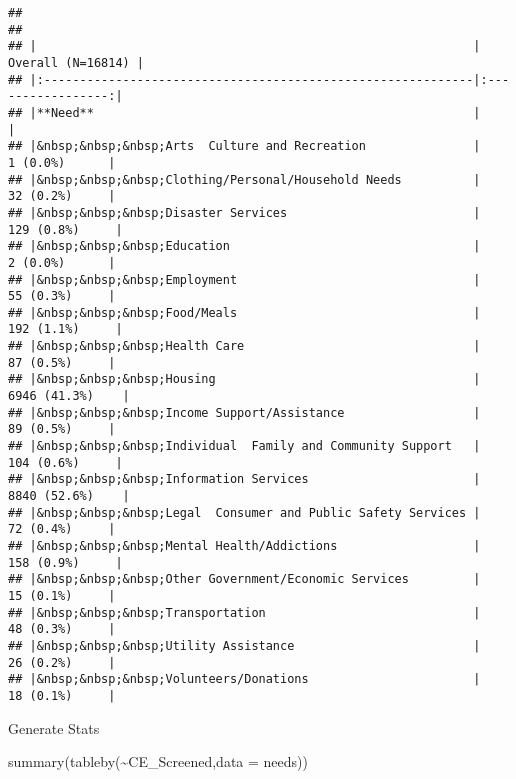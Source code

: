 \documentclass[
]{article}
\newenvironment{Shaded}{\begin{snugshade}}{\end{snugshade}}
\newcommand{\AttributeTok}[1]{\textcolor[rgb]{0.77,0.63,0.00}{#1}}
\newcommand{\FunctionTok}[1]{\textcolor[rgb]{0.00,0.00,0.00}{#1}}
\newcommand{\NormalTok}[1]{#1}
\newcommand{\SpecialCharTok}[1]{\textcolor[rgb]{0.00,0.00,0.00}{#1}}
\begin{document}
\begin{verbatim}
## 
## 
## |                                                             | Overall (N=16814) |
## |:------------------------------------------------------------|:-----------------:|
## |**Need**                                                     |                   |
## |&nbsp;&nbsp;&nbsp;Arts  Culture and Recreation               |     1 (0.0%)      |
## |&nbsp;&nbsp;&nbsp;Clothing/Personal/Household Needs          |     32 (0.2%)     |
## |&nbsp;&nbsp;&nbsp;Disaster Services                          |    129 (0.8%)     |
## |&nbsp;&nbsp;&nbsp;Education                                  |     2 (0.0%)      |
## |&nbsp;&nbsp;&nbsp;Employment                                 |     55 (0.3%)     |
## |&nbsp;&nbsp;&nbsp;Food/Meals                                 |    192 (1.1%)     |
## |&nbsp;&nbsp;&nbsp;Health Care                                |     87 (0.5%)     |
## |&nbsp;&nbsp;&nbsp;Housing                                    |   6946 (41.3%)    |
## |&nbsp;&nbsp;&nbsp;Income Support/Assistance                  |     89 (0.5%)     |
## |&nbsp;&nbsp;&nbsp;Individual  Family and Community Support   |    104 (0.6%)     |
## |&nbsp;&nbsp;&nbsp;Information Services                       |   8840 (52.6%)    |
## |&nbsp;&nbsp;&nbsp;Legal  Consumer and Public Safety Services |     72 (0.4%)     |
## |&nbsp;&nbsp;&nbsp;Mental Health/Addictions                   |    158 (0.9%)     |
## |&nbsp;&nbsp;&nbsp;Other Government/Economic Services         |     15 (0.1%)     |
## |&nbsp;&nbsp;&nbsp;Transportation                             |     48 (0.3%)     |
## |&nbsp;&nbsp;&nbsp;Utility Assistance                         |     26 (0.2%)     |
## |&nbsp;&nbsp;&nbsp;Volunteers/Donations                       |     18 (0.1%)     |
\end{verbatim}

Generate Stats

\begin{Shaded}
\begin{Highlighting}[]
\FunctionTok{summary}\NormalTok{(}\FunctionTok{tableby}\NormalTok{(}\SpecialCharTok{\textasciitilde{}}\NormalTok{CE\_Screened,}\AttributeTok{data =}\NormalTok{ needs))}
\end{Highlighting}
\end{Shaded}
\end{document}
